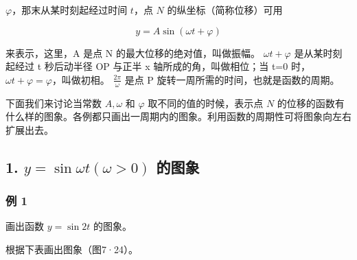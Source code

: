 \(\varphi\)，那末从某时刻起经过时间 \(t\)，点 \(N\)
的纵坐标（简称位移）可用

\[
y = A \sin (\omega t + \varphi)
\]

来表示，这里，A 是点 N 的最大位移的绝对值，叫做振幅。
\(\omega t+\varphi\) 是从某时刻起经过 t 秒后动半径 OP 与正半 x
轴所成的角，叫做相位；当 t=0 时，
\(\omega t+\varphi=\varphi\)，叫做初相。 \(\frac{2\pi}{\omega}\) 是点 P
旋转一周所需的时间，也就是函数的周期。

下面我们来讨论当常数 \(A, \omega\) 和 \(\varphi\)
取不同的值的时候，表示点 \(N\)
的位移的函数有什么样的图象。各例都只画出一周期内的图象。利用函数的周期性可将图象向左右扩展出去。

\subsection{\texorpdfstring{1. \(y = \sin \omega t(\omega > 0)\) 的图象}{1. y = \textbackslash sin \textbackslash omega t(\textbackslash omega \textgreater{} 0) 的图象}}\label{y-sin-omega-tomega-0-ux7684ux56feux8c61}

\subsubsection{例 1}

画出函数 \(y=\sin2t\) 的图象。

 根据下表画出图象（图7·24）。

